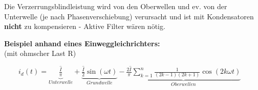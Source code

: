      	Die Verzerrungsblindleistung wird von den Oberwellen und ev. von der Unterwelle (je
     	nach Phasenverschiebung) verursacht und ist mit Kondensatoren \textbf{nicht} zu kompensieren -
     	Aktive Filter w\"aren n\"otig.
		\\		
		
	\begin{minipage}[c]{8cm} 
	   \textbf{Beispiel anhand eines Einweggleichrichters:}	  	\\
	   (mit ohmscher Last R) 
	\end{minipage}   
	\begin{minipage}[c]{10cm} 	
	   $ \qquad i_d(t) = \underbrace{\frac{\hat{I}}{\pi}}_{Unterwelle} + \underbrace{\frac{\hat{I}}{2}
	   \sin(\omega t)}_{Grundwelle} - \underbrace{\frac{2\hat{I}}{\pi} \sum\limits_{k=1}^n \frac{1}{(2k-1)(2k+1)} \cos(2k\omega t)}_{Oberwellen} $
	\end{minipage}   
		
